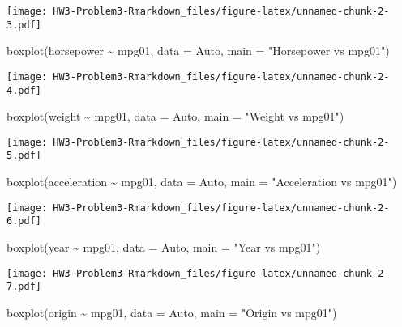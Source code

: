 \documentclass[
]{article}
\newenvironment{Shaded}{\begin{snugshade}}{\end{snugshade}}
\newcommand{\AttributeTok}[1]{\textcolor[rgb]{0.77,0.63,0.00}{#1}}
\newcommand{\FunctionTok}[1]{\textcolor[rgb]{0.00,0.00,0.00}{#1}}
\newcommand{\NormalTok}[1]{#1}
\newcommand{\SpecialCharTok}[1]{\textcolor[rgb]{0.00,0.00,0.00}{#1}}
\newcommand{\StringTok}[1]{\textcolor[rgb]{0.31,0.60,0.02}{#1}}
\begin{document}
\texttt{[image: HW3-Problem3-Rmarkdown\_files/figure-latex/unnamed-chunk-2-3.pdf]}

\begin{Shaded}
\begin{Highlighting}[]
\FunctionTok{boxplot}\NormalTok{(horsepower }\SpecialCharTok{\textasciitilde{}}\NormalTok{ mpg01, }\AttributeTok{data =}\NormalTok{ Auto, }\AttributeTok{main =} \StringTok{"Horsepower vs mpg01"}\NormalTok{)}
\end{Highlighting}
\end{Shaded}

\texttt{[image: HW3-Problem3-Rmarkdown\_files/figure-latex/unnamed-chunk-2-4.pdf]}

\begin{Shaded}
\begin{Highlighting}[]
\FunctionTok{boxplot}\NormalTok{(weight }\SpecialCharTok{\textasciitilde{}}\NormalTok{ mpg01, }\AttributeTok{data =}\NormalTok{ Auto, }\AttributeTok{main =} \StringTok{"Weight vs mpg01"}\NormalTok{)}
\end{Highlighting}
\end{Shaded}

\texttt{[image: HW3-Problem3-Rmarkdown\_files/figure-latex/unnamed-chunk-2-5.pdf]}

\begin{Shaded}
\begin{Highlighting}[]
\FunctionTok{boxplot}\NormalTok{(acceleration }\SpecialCharTok{\textasciitilde{}}\NormalTok{ mpg01, }\AttributeTok{data =}\NormalTok{ Auto, }\AttributeTok{main =} \StringTok{"Acceleration vs mpg01"}\NormalTok{)}
\end{Highlighting}
\end{Shaded}

\texttt{[image: HW3-Problem3-Rmarkdown\_files/figure-latex/unnamed-chunk-2-6.pdf]}

\begin{Shaded}
\begin{Highlighting}[]
\FunctionTok{boxplot}\NormalTok{(year }\SpecialCharTok{\textasciitilde{}}\NormalTok{ mpg01, }\AttributeTok{data =}\NormalTok{ Auto, }\AttributeTok{main =} \StringTok{"Year vs mpg01"}\NormalTok{)}
\end{Highlighting}
\end{Shaded}

\texttt{[image: HW3-Problem3-Rmarkdown\_files/figure-latex/unnamed-chunk-2-7.pdf]}

\begin{Shaded}
\begin{Highlighting}[]
\FunctionTok{boxplot}\NormalTok{(origin }\SpecialCharTok{\textasciitilde{}}\NormalTok{ mpg01, }\AttributeTok{data =}\NormalTok{ Auto, }\AttributeTok{main =} \StringTok{"Origin vs mpg01"}\NormalTok{)}
\end{Highlighting}
\end{Shaded}
\end{document}
